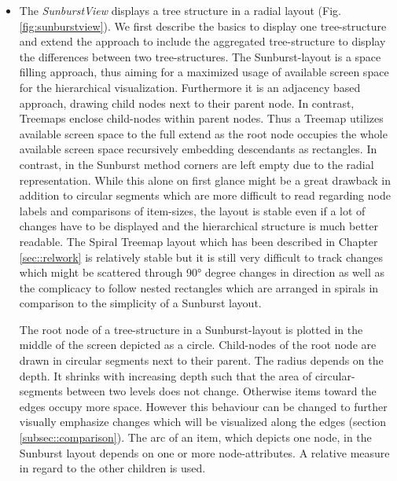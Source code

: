 \begin{itemize}
The diff-algorithm is only ever called once for every visible view\footnote{the only exception are small multiple displays which represents changes among several tree-structures}. The diff-tuples are then broadcasted to all other views which are capable of displaying the aggregated tree-structure.

\item
The \emph{SunburstView} displays a tree structure in a radial layout (Fig. \ref{fig:sunburstview}). We first describe the basics to display one tree-structure and extend the approach to include the aggregated tree-structure to display the differences between two tree-structures. The Sunburst-layout is a space filling approach, thus aiming for a maximized usage of available screen space for the hierarchical visualization. Furthermore it is an adjacency based approach, drawing child nodes next to their parent node. In contrast, Treemaps enclose child-nodes within parent nodes. Thus a Treemap utilizes available screen space to the full extend as the root node occupies the whole available screen space recursively embedding descendants as rectangles. In contrast, in the Sunburst method corners are left empty due to the radial representation. While this alone on first glance might be a great drawback in addition to circular segments which are more difficult to read regarding node labels and comparisons of item-sizes, the layout is stable even if a lot of changes have to be displayed and the hierarchical structure is much better readable. The Spiral Treemap layout which has been described in Chapter \ref{sec::relwork} is relatively stable but it is still very difficult to track changes which might be scattered through 90° degree changes in direction as well as the complicacy to follow nested rectangles which are arranged in spirals in comparison to the simplicity of a Sunburst layout.

The root node of a tree-structure in a Sunburst-layout is plotted in the middle of the screen depicted as a circle. Child-nodes of the root node are drawn in circular segments next to their parent. The radius depends on the depth. It shrinks with increasing depth such that the area of circular-segments between two levels does not change. Otherwise items toward the edges occupy more space. However this behaviour can be changed to further visually emphasize changes which will be visualized along the edges (section \ref{subsec::comparison}). The arc of an item, which depicts one node, in the Sunburst layout depends on one or more node-attributes. A relative measure in regard to the other children is used.


\end{itemize}

